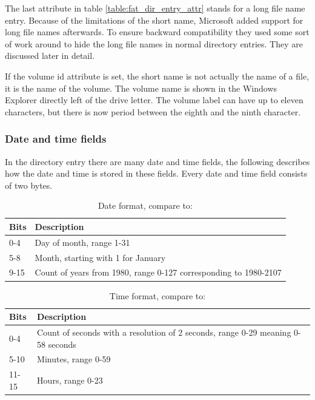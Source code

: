 The last attribute in table \ref{table:fat_dir_entry_attr} stands for a long file name entry. Because of the limitations of the short name, Microsoft added support for long file names afterwards. To ensure backward compatibility they used some sort of work around to hide the long file names in normal directory entries. They are discussed later in detail.

If the volume id attribute is set, the short name is not actually the name of a file, it is the name of the volume. The volume name is shown in the Windows Explorer directly left of the drive letter. The volume label can have up to eleven characters, but there is now period between the eighth and the ninth character.

\subsubsection{Date and time fields}

In the directory entry there are many date and time fields, the following describes how the date and time is stored in these fields. Every date and time field consists of two bytes. 

\begin{table}[!ht]
\caption{Date format, compare to: \cite{usb_ms_jan, fatgen103}}
\centering
\begin{tabular}{|l|p{9cm}|}
\hline\hline
\textbf{Bits} & \textbf{Description}\\ \hline
0-4 & Day of month, range 1-31 \\ \hline
5-8 & Month, starting with 1 for January \\ \hline
9-15 & Count of years from 1980, range 0-127 corresponding to 1980-2107 \\ \hline
\end{tabular}
\label{table:fat_dir_entry_date}
\end{table}

\begin{table}[!ht]
\caption{Time format, compare to: \cite{usb_ms_jan, fatgen103}}
\centering
\begin{tabular}{|l|p{9cm}|}
\hline\hline
\textbf{Bits} & \textbf{Description} \\ \hline
0-4 & Count of seconds with a resolution of 2 seconds, range 0-29 meaning 0-58 seconds \\ \hline
5-10 & Minutes, range 0-59 \\ \hline
11-15 & Hours, range 0-23 \\ \hline
\end{tabular}
\label{table:fat_dir_entry_time}
\end{table}

